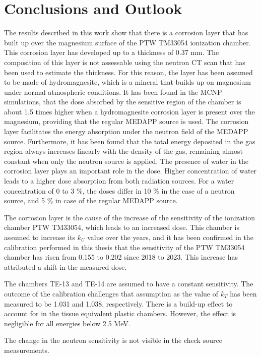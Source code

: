 \chapter{Conclusions and Outlook}

The results described in this work show that there is a corrosion layer that has built up over the magnesium surface of the PTW TM33054 ionization chamber. This corrosion layer has developed up to a thickness of 0.37 \unit{\milli\meter}. The composition of this layer is not assessable using the neutron CT scan that has been used to estimate the thickness. For this reason, the layer has been assumed to be made of hydromagnesite, which is a mineral that builds up on magnesium under normal atmospheric conditions. It has been found in the MCNP simulations, that the dose absorbed by the sensitive region of the chamber is about 1.5 times higher when a hydromagnesite corrosion layer is present over the magnesium, providing that the regular MEDAPP source is used. The corrosion layer facilitates the energy absorption under the neutron field of the MEDAPP source. Furthermore, it has been found that the total energy deposited in the gas region always increases linearly with the density of the gas, remaining almost constant when only the neutron source is applied. The presence of water in the corrosion layer plays an important role in the dose. Higher concentration of water leads to a higher dose absorption from both radiation sources. For a water concentration of 0 to 3 $\%$, the doses differ in 10 $\%$ in the case of a neutron source, and 5 $\%$ in case of the regular MEDAPP source.

The corrosion layer is the cause of the increase of the sensitivity of the ionization chamber PTW TM33054, which leads to an increased dose. This chamber is assumed to increase its $k_U$ value over the years, and it has been confirmed in the calibration performed in this thesis that the sensitivity of the PTW TM33054 chamber has risen from 0.155 to 0.202 since 2018 to 2023. This increase has attributed a shift in the measured dose. 

The chambers TE-13 and TE-14 are assumed to have a constant sensitivity. The outcome of the calibration challenges that assumption as the value of $k_T$ has been measured to be 1.031 and 1.038, respectively. There is a build-up effect to account for in the tissue equivalent plastic chambers. However, the effect is negligible for all energies below 2.5 \unit{\mega\electronvolt}.

The change in the neutron sensitivity is not visible in the check source measurements.

